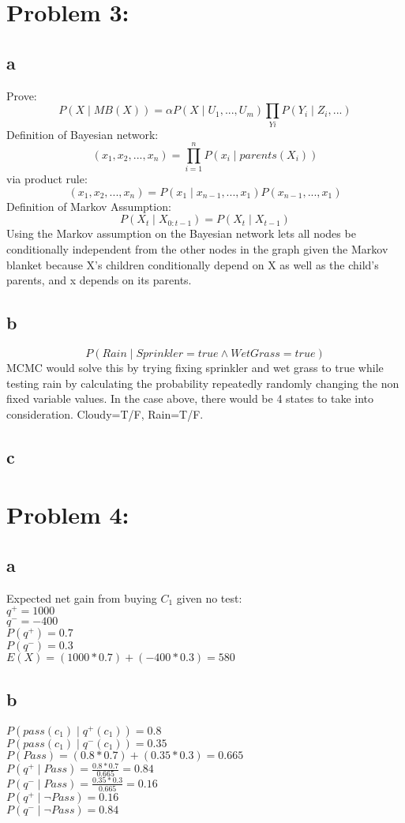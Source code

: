 \documentclass[11pt, oneside]{article}   	%
\begin{document}
\begin{flushleft}
\section*{Problem 3:}
\subsection*{a}
Prove:
$$P(X \mid MB(X)) = \alpha P(X \mid U_{1}, ..., U_{m}) \prod_{Yi} P(Y_{i} \mid Z_{i}, ...)$$
Definition of Bayesian network:
$$(x_{1},x_{2},...,x_{n})=\prod_{i=1}^{n} P(x_{i} \mid parents(X_{i}))$$
via product rule:
$$(x_{1},x_{2},...,x_{n})=P(x_{1} \mid x_{n-1}, ..., x_{1})P(x_{n-1},...,x_{1})$$
Definition of Markov Assumption:
$$P(X_{t} \mid X_{0:t-1}) = P(X_{t} \mid X_{t-1})$$
Using the Markov assumption on the Bayesian network lets all nodes be conditionally independent from the other nodes in the graph given the Markov blanket because X's children  conditionally depend on X as well as the child's parents, and x depends on its parents.
\subsection*{b}
$$P(Rain \mid Sprinkler=true \wedge WetGrass=true)$$
MCMC would solve this by trying fixing sprinkler and wet grass to true while testing rain by calculating the probability repeatedly randomly changing the non fixed variable values. In the case above, there would be 4 states to take into consideration. Cloudy=T/F, Rain=T/F.
\subsection*{c}
\section*{Problem 4:}
\subsection*{a}
Expected net gain from buying $C_1$ given no test:\\
$q^+ = 1000$\\
$q^- = -400$\\
$P(q^+ ) = 0.7$\\
$P(q^- ) = 0.3$\\
$E(X) = (1000*0.7)+(-400*0.3) = 580$\\
\subsection*{b}
$P(pass(c_1 )\mid q^+ (c_1 )) = 0.8$\\
$P(pass(c_1 )\mid q^- (c_1 )) = 0.35$\\
\medskip
$P(Pass) = (0.8*0.7)+(0.35*0.3) = 0.665$\\
$P(q^+ \mid Pass) = \frac{0.8*0.7}{0.665} = 0.84$\\
$P(q^- \mid Pass) = \frac{0.35*0.3}{0.665} = 0.16$\\
$P(q^+ \mid \neg Pass) = 0.16$\\
$P(q^- \mid \neg Pass) = 0.84$\\

\end{flushleft}
\end{document}

